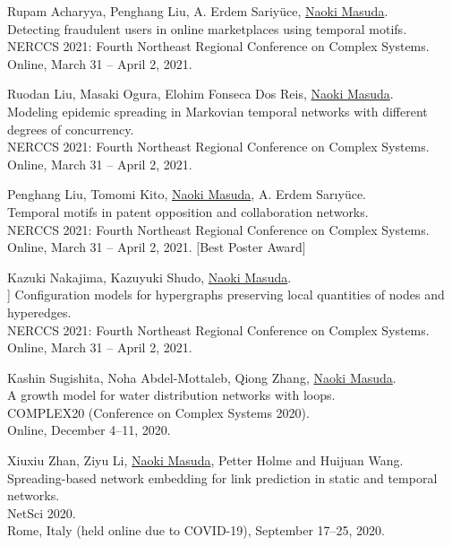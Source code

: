 \documentclass[11pt,letter]{article}
\begin{document}
\begin{etaremune}
\item Rupam Acharyya, Penghang Liu, A. Erdem Sariy\"{u}ce, \underline{Naoki Masuda}.\\
Detecting fraudulent users in online marketplaces using temporal motifs.\\
NERCCS 2021: Fourth Northeast Regional Conference on Complex Systems.\\
Online, March 31 -- April 2, 2021.

\item Ruodan Liu, Masaki Ogura, Elohim Fonseca Dos Reis, \underline{Naoki Masuda}.\\
Modeling epidemic spreading in Markovian temporal networks with different degrees of concurrency.\\
NERCCS 2021: Fourth Northeast Regional Conference on Complex Systems.\\
Online, March 31 -- April 2, 2021.

\item Penghang Liu, Tomomi Kito, \underline{Naoki Masuda}, A. Erdem Sar{\i}y\"{u}ce.\\
Temporal motifs in patent opposition and collaboration networks.\\
NERCCS 2021: Fourth Northeast Regional Conference on Complex Systems.\\
Online, March 31 -- April 2, 2021.
$[$Best Poster Award$]$

\item Kazuki Nakajima, Kazuyuki Shudo, \underline{Naoki Masuda}.\\]
Configuration models for hypergraphs preserving local quantities of nodes and hyperedges.\\
NERCCS 2021: Fourth Northeast Regional Conference on Complex Systems.\\
Online, March 31 -- April 2, 2021.

\item Kashin Sugishita, Noha Abdel-Mottaleb, Qiong Zhang, \underline{Naoki Masuda}.\\
A growth model for water distribution networks with loops.\\
COMPLEX20 (Conference on Complex Systems 2020).\\
Online, December 4--11, 2020.

\item Xiuxiu Zhan, Ziyu Li, \underline{Naoki Masuda}, Petter Holme and Huijuan Wang.\\
Spreading-based network embedding for link prediction in static and temporal networks.\\
NetSci 2020.\\
Rome, Italy (held online due to COVID-19), September 17--25, 2020.


\end{etaremune}
\end{document}
